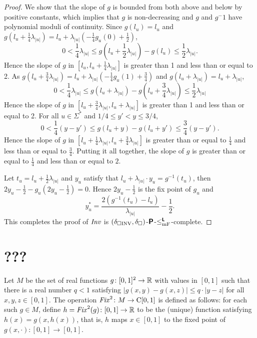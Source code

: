 \documentclass[envcountsame,orivec,oribibl]{llncs}
\begin{document}
\begin{proof}
We show that the slope of $g$ is bounded from both above and below
by positive constants, which implies that $g$ is non-decreasing and 
$g$ and $g^-1$ have polynomial moduli of continuity.
Since $g(l_u)=l_u$ and 
$g(l_u+\frac{1}{4}\lambda_{|u|}) = l_u + \lambda_{|u|}(-\frac{1}{4}g_u(0) + \frac{1}{2})$,
\begin{equation}
 0 < \frac{1}{4}\lambda_{|u|}
 \le g \left( l_u+ \frac{1}{2} \lambda_{|u|} \right) - g(l_u)
 \le \frac{1}{2}\lambda_{|u|}.
\end{equation}
Hence the slope of $g$ in $[l_u, l_u + \frac{1}{4}\lambda_{|u|}]$ is 
greater than 1 and less than or equal to 2.
As $g(l_u+\frac{3}{4}\lambda_{|u|}) = l_u + \lambda_{|u|}(-\frac{1}{4}g_u(1) + \frac{3}{4})$ and
$g(l_u+\lambda_{|u|}) = l_u+\lambda_{|u|}$,
\begin{equation}
 0 < \frac{1}{4}\lambda_{|u|}
 \le g(l_u+\lambda_{|u|}) - g \left(l_u+ \frac 3 4 \lambda_{|u|} \right)
 \le \frac{1}{2}\lambda_{|u|}
\end{equation}
Hence the slope of $g$ in $[l_u + \frac{3}{4}\lambda_{|u|}, l_u + \lambda_{|u|}]$ is greater than 1 and less than or equal to 2.
For all $u \in \Sigma^*$ and $1/4 \le y' < y \le 3/4$,
\begin{equation}
0 < \frac{1}{4}(y - y') \le g(l_u+y) - g(l_u+y') \le \frac{3}{4}(y - y').
\end{equation}
Hence the slope of $g$ in $[l_u + \frac{1}{4}\lambda_{|u|}, l_u + \frac{3}{4}\lambda_{|u|}]$ 
is greater than or equal to $\frac{1}{4}$ and less than or equal to $\frac{3}{4}$.
Putting it all together, the slope of $g$ is greater than or equal to $\frac{1}{4}$ and less than or equal to $2$.

Let $t_u = l_u + \frac{1}{2}\lambda_{|u|}$ and $y_u$ satisfy that 
$l_u + \lambda_{|u|} \cdot y_u = g^{-1}(t_u)$, then
$2y_u - \frac{1}{2} - g_u (2y_u - \frac{1}{2}) = 0$.
Hence $2y_u - \frac{1}{2}$ is the fix point of $g_u$ and 
\begin{equation}
 y^*_u = \frac{2\left( g^{-1}(t_u) - l_u \right)}{\lambda_{|u|}} - \frac{1}{2}.
\end{equation}
This completes the proof of $\mathit{Inv}$ is $(\delta _{\square \mathrm{INV}}, \delta _\square)$-$\text{\bfseries \sffamily \upshape P}$-$\leq _{\mathrm{mF}} ^{\text{\bfseries \sffamily \upshape L}}$-complete.
\end{proof}

\section{???}

Let $M$ be the set of real functions 
$g \colon [0, 1]^2 \to \mathbb R$ with values in $[0, 1]$ 
such that there is a real number $q < 1$
satisfying $|g(x, y) - g(x, z)| \le q \cdot |y - z|$
for all $x, y, z \in [0,1]$. 
The operation $\mathit{Fix}^2 \colon M \to \mathrm C [0, 1]$ is defined as follows:
for each such $g \in M$, 
define $h = \mathit{Fix}^2(g) \colon [0, 1] \to \mathbb R$ to be 
the (unique) function satisfying $h(x) = g(x, h(x))$, that is, 
$h$ maps $x \in [0,1]$ to the fixed point of $g(x, \cdot) \colon [0,1] \to [0,1]$.
\end{document}
